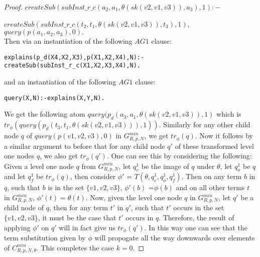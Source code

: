 \begin{proof}
$createSub(subInst\_r\_c(a_{2},a_{1},\theta(sk(v2,v1,v3)),a_{3}),1):-$  

$createSub(subInst\_r\_c(t_{2},t_{1},\theta(sk(v2,v1,v3)),t_{3}),1)$, $query(p(a_{1},a_{2},a_{3}),0).$\\
Then via an instantiation of the following $AG1$ clause:
\begin{lstlisting}[frame=none]
explains(p_d(X4,X2,X3),p(X1,X2,X4),N):-
createSub(subInst_r_c(X1,X2,X3,X4),N).    
\end{lstlisting}
and an instantiation of the following $AG1$ clause:
\begin{lstlisting}[frame=none]
query(X,N):-explains(X,Y,N). 
\end{lstlisting}
   

We get the following atom $query(p_{d}(a_{3},a_{1},\theta(sk(v2,v1,v3)),1)$ which is $tr_{\phi}(query(p_{d}(t_{3},t_{1},\theta(sk(v2,v1,v3))),1))$. Similarly for any other child node $q$ of $query(p(v1,v2,v3),0)$ in $G_{R,p,N}^{min}$, we get $tr_{\phi}(q)$. Now it follows by a similar argument to before that for any child node $q'$ of these transformed level one nodes $q$, we also get $tr_{\phi}(q')$. One can see this by considering the following: Given a level one node $q$ from $G_{R,p,N}^{min}$, let $q_{c}^{1}$ be the image of $q$ under $\theta$, let $q_{o}^{1}$ be $q$ and let $q_{f}^{1}$ be $tr_{\phi}(q)$, then consider $\phi'$ = $T(\theta, q_{c}^{1},q_{o}^{1},q_{f}^{1})$. Then on any term $b$ in $q$, such that $b$ is in the set $\{v1,v2,v3\}$, $\phi'(b)$ =$\phi(b)$ and on all other terms $t$ in $G_{R,p,N}^{min}$, $\phi'(t)=\theta(t)$. Now, given the level one node $q$ in $G_{R,p,N}^{min}$, let $q'$ be a child node of $q$, then for any term $t'$ in $q'$, such that $t'$ occurs in the set $\{v1,v2,v3\}$, it must be the case that $t'$ occurs in $q$. Therefore, the result of applying $\phi'$ on $q'$ will in fact give us $tr_{\phi}(q')$. In this way one can see that the term substitution given by $\phi$ will propogate all the way downwards over elements of $C_{R,p,N,\theta}^{min}$. This completes the case $k=0$. 


\end{proof}
